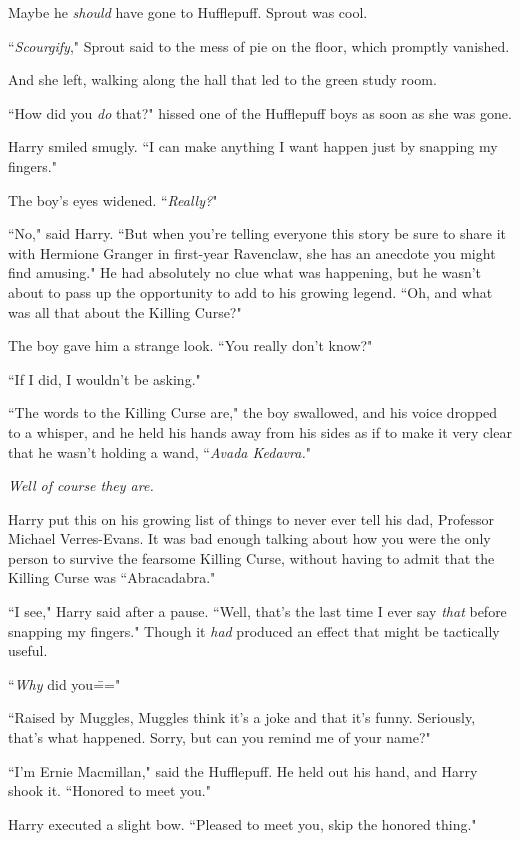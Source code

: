 Maybe he \emph{should} have gone to Hufflepuff. Sprout was cool.

``\emph{Scourgify}," Sprout said to the mess of pie on the floor, which promptly vanished.

And she left, walking along the hall that led to the green study room.

``How did you \emph{do} that?" hissed one of the Hufflepuff boys as soon as she was gone.

Harry smiled smugly. ``I can make anything I want happen just by snapping my fingers."

The boy's eyes widened. ``\emph{Really?}"

``No," said Harry. ``But when you're telling everyone this story be sure to share it with Hermione Granger in first-year Ravenclaw, she has an anecdote you might find amusing." He had absolutely no clue what was happening, but he wasn't about to pass up the opportunity to add to his growing legend. ``Oh, and what was all that about the Killing Curse?"

The boy gave him a strange look. ``You really don't know?"

``If I did, I wouldn't be asking."

``The words to the Killing Curse are," the boy swallowed, and his voice dropped to a whisper, and he held his hands away from his sides as if to make it very clear that he wasn't holding a wand, ``\emph{Avada Kedavra.}"

\emph{Well of course they are.}

Harry put this on his growing list of things to never ever tell his dad, Professor Michael Verres-Evans. It was bad enough talking about how you were the only person to survive the fearsome Killing Curse, without having to admit that the Killing Curse was ``Abracadabra."

``I see," Harry said after a pause. ``Well, that's the last time I ever say \emph{that} before snapping my fingers." Though it \emph{had} produced an effect that might be tactically useful.

``\emph{Why} did you\==="

``Raised by Muggles, Muggles think it's a joke and that it's funny. Seriously, that's what happened. Sorry, but can you remind me of your name?"

``I'm Ernie Macmillan," said the Hufflepuff. He held out his hand, and Harry shook it. ``Honored to meet you."

Harry executed a slight bow. ``Pleased to meet you, skip the honored thing."

